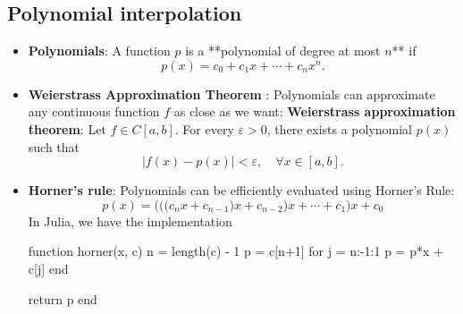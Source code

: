 \documentclass{report}
\begin{document}
    \subsection{Polynomial interpolation}
    \begin{itemize}
        \item \textbf{Polynomials}: A function $p$ is a **polynomial of degree at most $n$** if
            $$p(x) = c_0 + c_1 x + \cdots + c_n x^n.$$
            \bigbreak \noindent 

        \item \textbf{Weierstrass Approximation Theorem }:  Polynomials can approximate any continuous function $f$ as close as we want:
            \bigbreak \noindent 
            \textbf{Weierstrass approximation theorem}:
            Let $f \in C[a,b]$. For every $\varepsilon > 0$, there exists a polynomial $p(x)$ such that
            $$\left|f(x) - p(x)\right| < \varepsilon, \quad \forall x \in [a,b].$$
        \item \textbf{Horner's rule}:
            Polynomials can be efficiently evaluated using Horner's Rule:
          $$p(x) = \bigg( \Big( \big(c_n x + c_{n-1}\big)x + c_{n-2} \Big)x + \cdots + c_1\bigg)x + c_0$$
          \bigbreak \noindent 
          In Julia, we have the implementation
          \bigbreak \noindent 
          \begin{cppcode}
              function horner(x, c)
                  n = length(c) - 1
                  p = c[n+1]
                  for j = n:-1:1
                      p = p*x + c[j]
                  end

                  return p
              end
          \end{cppcode}


\end{itemize}
\end{document}

